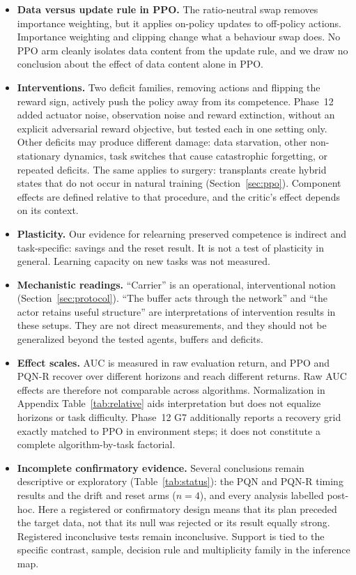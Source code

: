 \documentclass[10pt]{article} %
\begin{document}
\begin{itemize}
\item \textbf{Data versus update rule in PPO.} The ratio-neutral swap removes importance weighting, but it applies on-policy updates to off-policy actions. Importance weighting and clipping change what a behaviour swap does. No PPO arm cleanly isolates data content from the update rule, and we draw no conclusion about the effect of data content alone in PPO.
\item \textbf{Interventions.} Two deficit families, removing actions and flipping the reward sign, actively push the policy away from its competence. Phase~12 added actuator noise, observation noise and reward extinction, without an explicit adversarial reward objective, but tested each in one setting only. Other deficits may produce different damage: data starvation, other non-stationary dynamics, task switches that cause catastrophic forgetting, or repeated deficits. The same applies to surgery: transplants create hybrid states that do not occur in natural training (Section~\ref{sec:ppo}). Component effects are defined relative to that procedure, and the critic's effect depends on its context.
\item \textbf{Plasticity.} Our evidence for relearning preserved competence is indirect and task-specific: savings and the reset result. It is not a test of plasticity in general. Learning capacity on new tasks was not measured.
\item \textbf{Mechanistic readings.} ``Carrier'' is an operational, interventional notion (Section~\ref{sec:protocol}). ``The buffer acts through the network'' and ``the actor retains useful structure'' are interpretations of intervention results in these setups. They are not direct measurements, and they should not be generalized beyond the tested agents, buffers and deficits.
\item \textbf{Effect scales.} AUC is measured in raw evaluation return, and PPO and PQN-R recover over different horizons and reach different returns. Raw AUC effects are therefore not comparable across algorithms. Normalization in Appendix Table~\ref{tab:relative} aids interpretation but does not equalize horizons or task difficulty. Phase~12 G7 additionally reports a recovery grid exactly matched to PPO in environment steps; it does not constitute a complete algorithm-by-task factorial.
\item \textbf{Incomplete confirmatory evidence.} Several conclusions remain descriptive or exploratory (Table~\ref{tab:status}): the PQN and PQN-R timing results and the drift and reset arms ($n=4$), and every analysis labelled post-hoc. Here a registered or confirmatory design means that its plan preceded the target data, not that its null was rejected or its result equally strong. Registered inconclusive tests remain inconclusive. Support is tied to the specific contrast, sample, decision rule and multiplicity family in the inference map.

\end{itemize}
\end{document}
